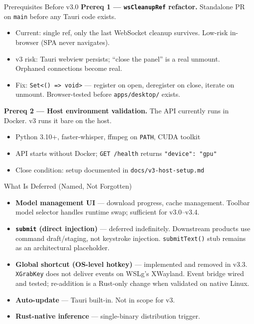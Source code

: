 \documentclass{beamer}
\begin{document}
\begin{frame}{Prerequisites Before v3.0}
    \small
    \textbf{Prereq 1 --- \texttt{wsCleanupRef} refactor.}
    Standalone PR on \texttt{main} before any Tauri code exists.

    \begin{itemize}\setlength{\itemsep}{0pt}
        \item Current: single ref, only the last WebSocket cleanup survives.
              Low-risk in-browser (SPA never navigates).
        \item v3 risk: Tauri webview persists; ``close the panel'' is a real unmount.
              Orphaned connections become real.
        \item Fix: \texttt{Set<() => void>} --- register on open, deregister on close,
              iterate on unmount. Browser-tested before \texttt{apps/desktop/} exists.
    \end{itemize}

    \vspace{0.2em}
    \textbf{Prereq 2 --- Host environment validation.}
    The API currently runs in Docker. v3 runs it bare on the host.

    \begin{itemize}\setlength{\itemsep}{0pt}
        \item Python 3.10+, faster-whisper, ffmpeg on \texttt{PATH}, CUDA toolkit
        \item API starts without Docker; \texttt{GET /health} returns
              \texttt{"device": "gpu"}
        \item Close condition: setup documented in \texttt{docs/v3-host-setup.md}
    \end{itemize}
\end{frame}


\begin{frame}{What Is Deferred (Named, Not Forgotten)}
    \small
    \begin{itemize}\setlength{\itemsep}{2pt}
        \item \textbf{Model management UI} --- download progress, cache management.
              Toolbar model selector handles runtime swap; sufficient for v3.0--v3.4.

        \item \textbf{\texttt{submit} (direct injection)} --- deferred indefinitely.
              Downstream products use command draft/staging, not keystroke injection.
              \texttt{submitText()} stub remains as an architectural placeholder.

        \item \textbf{Global shortcut (OS-level hotkey)} --- implemented and removed
              in v3.3. \texttt{XGrabKey} does not deliver events on WSLg's XWayland.
              Event bridge wired and tested; re-addition is a Rust-only change when
              validated on native Linux.

        \item \textbf{Auto-update} --- Tauri built-in. Not in scope for v3.

        \item \textbf{Rust-native inference} --- single-binary distribution trigger.
    \end{itemize}
\end{frame}
\end{document}

